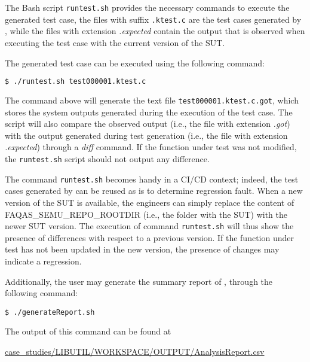 The Bash script \texttt{runtest.sh} provides the necessary commands to execute the generated test case, the files with suffix \texttt{.ktest.c}  are the test cases generated by \SEMUS, while the files with extension \emph{.expected} contain the output that is observed when executing the test case with the current version of the SUT.

The generated test case can be executed using the following command:

\begin{lstlisting}[language=bash]
 $ ./runtest.sh test000001.ktest.c
\end{lstlisting}

The command above will generate the text file \texttt{test000001.ktest.c.got}, which stores the system outputs generated during the execution of the test case. The script will also compare the observed output (i.e., the file with extension \emph{.got}) with the output generated during test generation (i.e., the file with extension \emph{.expected}) through a \emph{diff} command. If the function under test was not modified, the \texttt{runtest.sh} script should not output any difference.


The command \texttt{runtest.sh} becomes handy in a CI/CD context; indeed, the test cases generated by \SEMUS can be reused as is to determine regression fault. When a new version of the SUT is available, the engineers can simply replace the content of FAQAS\_SEMU\_REPO\_ROOTDIR (i.e., the folder with the SUT) with the newer SUT version. The execution of command \texttt{runtest.sh} will thus show the presence of differences with respect to a previous version. If the function under test has not been updated in the new version, the presence of changes may indicate a regression.

Additionally, the user may generate the summary report of \SEMUS, through the following command:

\begin{lstlisting}[language={}, label=listing:semus_results_2]
 $ ./generateReport.sh
\end{lstlisting}


The output of this command can be found at \begin{scriptsize}\url{case_studies/LIBUTIL/WORKSPACE/OUTPUT/AnalysisReport.csv}\end{scriptsize}
